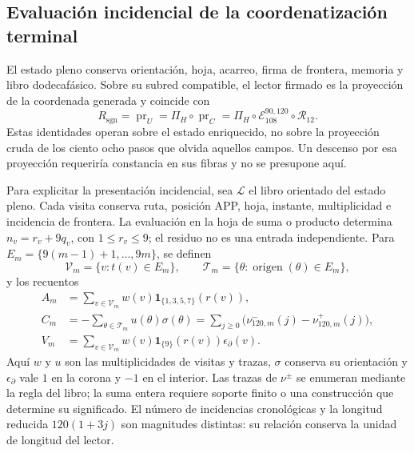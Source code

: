 \subsection{Evaluación incidencial de la coordenatización terminal}
\label{subsec:k-incidencias-residentes}

El estado pleno conserva orientación, hoja, acarreo, firma de frontera,
memoria y libro dodecafásico. Sobre su subred compatible, el lector firmado
es la proyección de la coordenada generada y coincide con
\[
 R_{\mathrm{sgn}}=\operatorname{pr}_{U}
 =\Pi_H\circ\operatorname{pr}_{C}
 =\Pi_H\circ\mathcal E_{108}^{90,120}\circ\mathcal R_{12}.
\]
Estas identidades operan sobre el estado enriquecido, no sobre la proyección
cruda de los ciento ocho pasos que olvida aquellos campos. Un descenso por
esa proyección requeriría constancia en sus fibras y no se presupone aquí.

Para explicitar la presentación incidencial, sea \(\mathscr L\) el libro
orientado del estado pleno. Cada visita conserva ruta, posición APP, hoja,
instante, multiplicidad e incidencia de frontera. La evaluación en la hoja
de suma o producto determina \(n_v=r_v+9q_v\), con \(1\leq r_v\leq9\);
el residuo no es una entrada independiente. Para
\(E_m=\{9(m-1)+1,\ldots,9m\}\), se definen
\[
 \mathscr V_m=\{v:t(v)\in E_m\},\qquad
 \mathscr T_m=\{\theta:\operatorname{origen}(\theta)\in E_m\},
\]
y los recuentos
\[
\begin{aligned}
 A_m&=\sum_{v\in\mathscr V_m}w(v)\mathbf1_{\{1,3,5,7\}}(r(v)),\\
 C_m&=-\sum_{\theta\in\mathscr T_m}u(\theta)\sigma(\theta)
     =\sum_{j\geq0}\bigl(\nu^-_{120,m}(j)-\nu^+_{120,m}(j)\bigr),\\
 V_m&=\sum_{v\in\mathscr V_m}w(v)\mathbf1_{\{9\}}(r(v))
                         \epsilon_\partial(v).
\end{aligned}
\]
Aquí \(w\) y \(u\) son las multiplicidades de visitas y trazas,
\(\sigma\) conserva su orientación y \(\epsilon_\partial\) vale \(1\) en
la corona y \(-1\) en el interior. Las trazas de \(\nu^\pm\) se enumeran
mediante la regla del libro; la suma entera requiere soporte finito o
una construcción que determine su significado. El número de incidencias
cronológicas y la longitud reducida \(120(1+3j)\) son magnitudes distintas:
su relación conserva la unidad de longitud del lector.

